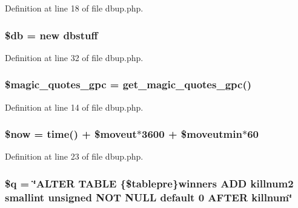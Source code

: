 Definition at line 18 of file dbup.\+php.

\hypertarget{dbup_8php_a1fa3127fc82f96b1436d871ef02be319}{
\subsubsection[{\$db}]{\setlength{\rightskip}{0pt plus 5cm}\$db = new {\bf dbstuff}}}\label{dbup_8php_a1fa3127fc82f96b1436d871ef02be319}


Definition at line 32 of file dbup.\+php.

\hypertarget{dbup_8php_a3bf6a6f8faa278d5cceb69655ecdb782}{
\subsubsection[{\$magic\+\_\+quotes\+\_\+gpc}]{\setlength{\rightskip}{0pt plus 5cm}\$magic\+\_\+quotes\+\_\+gpc = get\+\_\+magic\+\_\+quotes\+\_\+gpc()}}\label{dbup_8php_a3bf6a6f8faa278d5cceb69655ecdb782}


Definition at line 14 of file dbup.\+php.

\hypertarget{dbup_8php_af1d5ccdee975b8f4d20aaffc5b28557c}{
\subsubsection[{\$now}]{\setlength{\rightskip}{0pt plus 5cm}\$now = time() + \$moveut$\ast$3600 + \$moveutmin$\ast$60}}\label{dbup_8php_af1d5ccdee975b8f4d20aaffc5b28557c}


Definition at line 23 of file dbup.\+php.

\hypertarget{dbup_8php_abb0f8f809252372e25f48d52b63ef29d}{
\subsubsection[{\$q}]{\setlength{\rightskip}{0pt plus 5cm}\$q = \char`\"{}A\+L\+T\+E\+R T\+A\+B\+L\+E \{\$tablepre\}winners A\+D\+D killnum2 smallint unsigned N\+O\+T N\+U\+L\+L default 0 A\+F\+T\+E\+R killnum\char`\"{}}}\label{dbup_8php_abb0f8f809252372e25f48d52b63ef29d}


